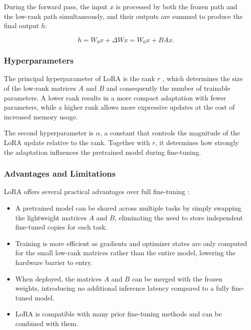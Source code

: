 During the forward pass, the input $x$ is processed by both
the frozen path and the low-rank path simultaneously, and
their outputs are summed to produce the final output $h$:

\begin{equation}
  h = W_0 x + \Delta W x = W_0 x + BAx.
  \label{eq:lora}
\end{equation}

\subsubsection*{Hyperparameters}

The principal hyperparameter of LoRA is the rank  $r$ \cite{hu2022lora}, which
determines the size of the low-rank matrices $A$ and $B$
and consequently the number of trainable parameters. A lower
rank results in a more compact adaptation with fewer
parameters, while a higher rank allows more expressive
updates at the cost of increased memory usage.

The second hyperparameter is $\alpha$, a constant that
controls the magnitude of the LoRA update relative to the
rank. Together with $r$, it determines how strongly the
adaptation influences the pretrained model during
fine-tuning.

\subsubsection*{Advantages and Limitations}

LoRA offers several practical advantages over full fine-tuning \cite{hu2022lora}:

\begin{itemize}
  \item A pretrained model can be shared across multiple
  tasks by simply swapping the lightweight matrices $A$ and
  $B$, eliminating the need to store independent fine-tuned
  copies for each task.

  \item Training is more efficient as gradients and optimizer
  states are only computed for the small low-rank matrices
  rather than the entire model, lowering the hardware barrier
  to entry.

  \item When deployed, the matrices $A$ and $B$ can be merged
  with the frozen weights, introducing no additional inference
  latency compared to a fully fine-tuned model.

  \item LoRA is compatible with many prior fine-tuning methods and can be
  combined with them.
\end{itemize}

